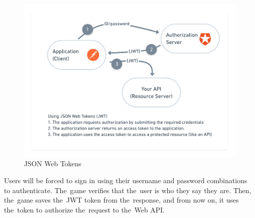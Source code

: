 \begin{figure}
    \centering
    \includegraphics[width=1\linewidth]{assets/design/jwt.png}
    \caption{JSON Web Tokens~\cite{lin_2018_tuck}}
    \label{fig:design:jwt}
\end{figure}

Users will be forced to sign in using their username and password combinations to authenticate.
The~game verifies that the~user is who they say they are.
Then, the~game saves the~JWT token from the~response, and from now on, it uses the~token to authorize the~request to the~Web API.
